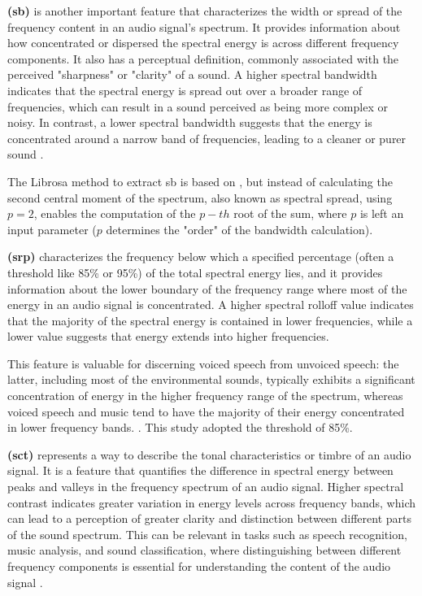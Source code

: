 \textbf{ (\gls{sb})} is another important feature that characterizes the width or spread of the frequency content in an audio signal's spectrum. It provides information about how concentrated or dispersed the spectral energy is across different frequency components. It also has a perceptual definition, commonly associated with the perceived "sharpness" or "clarity" of a sound. A higher spectral bandwidth indicates that the spectral energy is spread out over a broader range of frequencies, which can result in a sound perceived as being more complex or noisy. In contrast, a lower spectral bandwidth suggests that the energy is concentrated around a narrow band of frequencies, leading to a cleaner or purer sound \cite{Park2008}.

The Librosa \cite{McFee2015librosa_sw} method to extract \gls{sb} is based on \textcite{Klapuri2006}, but instead of calculating the second central moment of the spectrum, also known as spectral spread, using $p=2$, enables the computation of the $p-th$ root of the sum, where $p$ is left an input parameter ($p$ determines the "order" of the bandwidth calculation). 

\textbf{ (\gls{srp})} characterizes the frequency below which a specified percentage (often a threshold like 85\% or 95\%) of the total spectral energy lies, and it provides information about the lower boundary of the frequency range where most of the energy in an audio signal is concentrated. A higher spectral rolloff value indicates that the majority of the spectral energy is contained in lower frequencies, while a lower value suggests that energy extends into higher frequencies.

This feature is valuable for discerning voiced speech from unvoiced speech: the latter, including most of the environmental sounds, typically exhibits a significant concentration of energy in the higher frequency range of the spectrum, whereas voiced speech and music tend to have the majority of their energy concentrated in lower frequency bands. \cite{Giannakopoulos2014}. This study adopted the threshold of 85\%.

\textbf{ (\gls{sct})} represents a way to describe the tonal characteristics or timbre of an audio signal. It is a feature that quantifies the difference in spectral energy between peaks and valleys in the frequency spectrum of an audio signal. Higher spectral contrast indicates greater variation in energy levels across frequency bands, which can lead to a perception of greater clarity and distinction between different parts of the sound spectrum. This can be relevant in tasks such as speech recognition, music analysis, and sound classification, where distinguishing between different frequency components is essential for understanding the content of the audio signal \cite{Jiang2002}.

